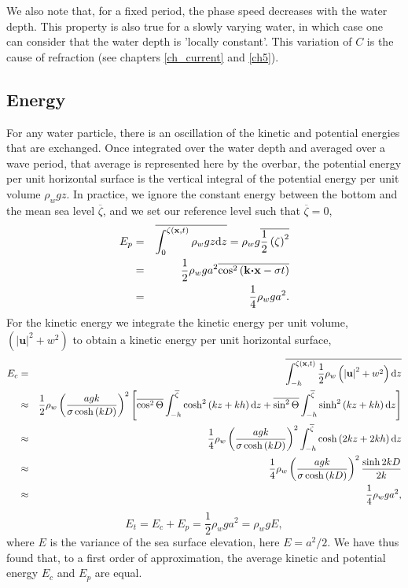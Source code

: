 We also note that, for a fixed period, the phase speed decreases 
with the water depth. This property is also true for a slowly varying water, 
in which case one can consider that the water depth is 'locally constant'. 
This variation of $C$ is the cause of refraction (see chapters \ref{ch_current} and \ref{ch5}). 


\subsection{Energy}
For any water particle, there is an oscillation of the kinetic and potential energies that are exchanged. 
Once integrated over the water depth and averaged over a wave period, that average is represented here by 
the overbar, the potential energy per unit horizontal surface is the vertical integral 
of the potential energy per unit volume $ \rho_w g z$. In practice, we ignore the constant energy between the 
bottom and the mean sea level $\overline{\zeta}$, and we set our reference level such that $\overline{\zeta}=0$,
\begin{eqnarray}
    E_p & = & \overline{ \int_{0}^{\zeta\left(\mathbf{x},t\right)} \rho_w g z {\mathrm d}z }
          = \rho_w g  \overline{ \frac{1}{2} \left(\zeta\right)^2 }   \nonumber\\
    & = & \frac{1}{2} \rho_w g a^2 \overline{ \cos^2\left({\mathbf k} \mbox{\boldmath $\cdot$} {\mathbf x}
    - \sigma t \right) } \nonumber\\
    & = & \frac{1}{4} \rho_w g a^2.
\end{eqnarray}
For the kinetic energy we integrate the kinetic energy per unit volume, $\left( \left|{\mathbf u}\right|^2 + w^2 \right)$ to obtain 
a kinetic energy per unit horizontal surface, 
\begin{eqnarray}
    E_c & = & \overline{  \int_{-h}^{\zeta\left(\mathbf{x},t\right)} \frac{1}{2} \rho_w
\left( \left|{\mathbf u}\right|^2 + w^2 \right) {\mathrm d}z } \nonumber\\
    & \approx & \frac{1}{2} \rho_w \left( \frac{a g k}{\sigma \cosh \left( kD \right)}
    \right)^2 \left[  \overline{ \cos^2 \Theta } \int_{-h}^{\overline{\zeta}} \cosh^2\left(kz+kh\right) {\mathrm d}z 
                   + \overline{ \sin^2 \Theta } \int_{-h}^{\overline{\zeta}} \sinh^2\left(kz+kh\right) {\mathrm d}z     \right] \nonumber\\
    & \approx & \frac{1}{4} \rho_w \left( \frac{a g k}{\sigma \cosh \left( kD \right)}
    \right)^2 \int_{-h}^{\overline{\zeta}} \cosh\left(2kz+2kh\right) {\mathrm d}z \nonumber \\
    & \approx & \frac{1}{4} \rho_w \left( \frac{a g k}{\sigma \cosh \left( kD \right)}
    \right)^2 \frac{\sinh 2kD}{2k}  \nonumber \\
    & \approx & \frac{1}{4} \rho_w g a^2,
\end{eqnarray}
\begin{equation}
    E_t= E_c+E_p= \frac{1}{2} \rho_w g a^2 = \rho_w g  E  ,\label{Etot}
\end{equation}
where $E$ is the variance of the sea surface elevation, here $E=a^2 /2$. 
We have thus found that, to a first order of approximation, the average kinetic and potential energy 
 $E_c$ and $E_p$ are equal. 

